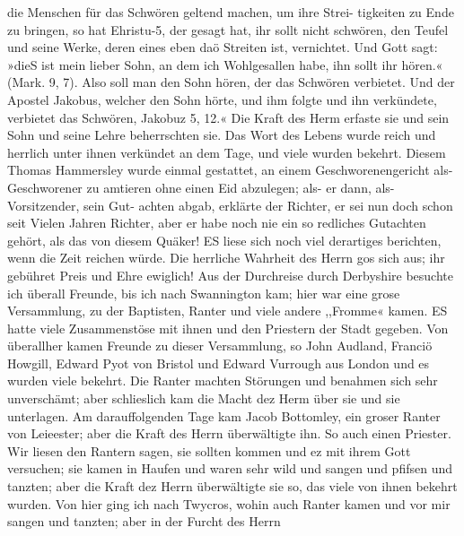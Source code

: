 die Menschen für das Schwören geltend machen, um ihre Strei-
tigkeiten zu Ende zu bringen, so hat Ehristu-5, der gesagt hat,
ihr sollt nicht schwören, den Teufel und seine Werke, deren eines
eben daö Streiten ist, vernichtet. Und Gott sagt: »dieS ist mein
lieber Sohn, an dem ich Wohlgesallen habe, ihn sollt ihr hören.«
(Mark. 9, 7). Also soll man den Sohn hören, der das Schwören
verbietet. Und der Apostel Jakobus, welcher den Sohn hörte,
und ihm folgte und ihn verkündete, verbietet das Schwören,
Jakobuz 5, 12.« Die Kraft des Herm erfaste sie und sein
Sohn und seine Lehre beherrschten sie. Das Wort des Lebens
wurde reich und herrlich unter ihnen verkündet an dem Tage,
und viele wurden bekehrt.
Diesem Thomas Hammersley wurde einmal gestattet, an
einem Geschworenengericht als- Geschworener zu amtieren ohne
einen Eid abzulegen; als- er dann, als- Vorsitzender, sein Gut-
achten abgab, erklärte der Richter, er sei nun doch schon seit Vielen
Jahren Richter, aber er habe noch nie ein so redliches Gutachten
gehört, als das von diesem Quäker! ES liese sich noch viel
derartiges berichten, wenn die Zeit reichen würde. Die herrliche
Wahrheit des Herrn gos sich aus; ihr gebühret Preis und Ehre
ewiglich!
Aus der Durchreise durch Derbyshire besuchte ich überall
Freunde, bis ich nach Swannington kam; hier war eine grose
Versammlung, zu der Baptisten, Ranter und viele andere ,,Fromme«
kamen. ES hatte viele Zusammenstöse mit ihnen und den Priestern
der Stadt gegeben. Von überallher kamen Freunde zu dieser
Versammlung, so John Audland, Franciö Howgill, Edward Pyot
von Bristol und Edward Vurrough aus London und es wurden
viele bekehrt. Die Ranter machten Störungen und benahmen sich
sehr unverschämt; aber schlieslich kam die Macht dez Herm über
sie und sie unterlagen. Am darauffolgenden Tage kam Jacob
Bottomley, ein groser Ranter von Leieester; aber die Kraft des
Herrn überwältigte ihn. So auch einen Priester. Wir liesen
den Rantern sagen, sie sollten kommen und ez mit ihrem Gott
versuchen; sie kamen in Haufen und waren sehr wild und sangen
und pfifsen und tanzten; aber die Kraft dez Herrn überwältigte
sie so, das viele von ihnen bekehrt wurden.
Von hier ging ich nach Twycros, wohin auch Ranter kamen
und vor mir sangen und tanzten; aber in der Furcht des Herrn


